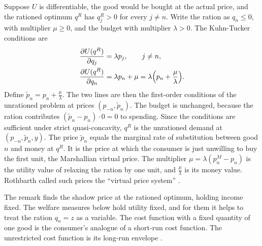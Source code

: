 \begin{remark}\label{rem:10-shadow}
Suppose $U$ is differentiable, the good would be bought at the actual price, and the rationed optimum $q^R$
has $q_j^R > 0$ for every $j \neq n$. Write the ration as $q_n \le 0$, with multiplier $\mu \ge 0$, and the
budget with multiplier $\lambda > 0$. The Kuhn-Tucker conditions are
\begin{align*}
  \frac{\partial U(q^R)}{\partial q_j} &= \lambda p_j, \qquad j \neq n, \\
  \frac{\partial U(q^R)}{\partial q_n} &= \lambda p_n + \mu = \lambda\Bigl(p_n + \frac{\mu}{\lambda}\Bigr).
\end{align*}
Define $\tilde p_n = p_n + \frac{\mu}{\lambda}$. The two lines are then the first-order conditions of the
unrationed problem at prices $(p_{-n},\tilde p_n)$. The budget is unchanged, because the ration contributes
$(\tilde p_n - p_n)\cdot 0 = 0$ to spending. Since the conditions are sufficient under strict
quasi-concavity, $q^R$ is the unrationed demand at $(p_{-n},\tilde p_n,y)$. The price $\tilde p_n$ equals the
marginal rate of substitution between good $n$ and money at $q^R$. It is the price at which the consumer is
just unwilling to buy the first unit, the Marshallian virtual price. The multiplier
$\mu = \lambda(p_n^M - p_n)$ is the utility value of relaxing the ration by one unit, and $\frac{\mu}{\lambda}$
is its money value. Rothbarth called such prices the ``virtual price system''
\citep[p.~211]{Hausman1997}.
\end{remark}

The remark finds the shadow price at the rationed optimum, holding income fixed. The welfare measures below hold
utility fixed, and for them it helps to treat the ration $q_n = z$ as a variable. The cost function with a fixed
quantity of one good is the consumer's analogue of a short-run cost function. The unrestricted cost function is its
long-run envelope \citep[p.~110]{DeatonMuellbauer1980b}.

